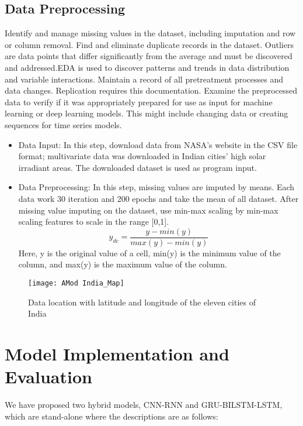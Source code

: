 \subsection{Data Preprocessing}
Identify and manage missing values in the dataset, including imputation and row or column removal. Find and eliminate duplicate records in the dataset. Outliers are data points that differ significantly from the average and must be discovered and addressed.EDA is used to discover patterns and trends in data distribution and variable interactions. Maintain a record of all pretreatment processes and data changes. Replication requires this documentation. Examine the preprocessed data to verify if it was appropriately prepared for use as input for machine learning or deep learning models. This might include changing data or creating sequences for time series models.
\begin{itemize}
\item
Data Input: In this step, download data from NASA's website in the CSV file format; multivariate data was downloaded in Indian cities' high solar irradiant areas. The downloaded dataset is used as program input.

\item
Data Preprocessing: In this step, missing values are imputed by means. Each data work 30 iteration and 200 epochs and take the mean of all dataset.
After missing value imputing on the dataset, use min-max scaling by min-max scaling features to scale in the range [0,1].
\begin{equation}
y_{dc}=\frac{y-min(y)}{max(y)-min(y)}
\end{equation}
Here, y is the original value of a cell, min(y) is the minimum value of the column, and max(y) is the maximum value of the column.
\end{itemize}


\begin{figure}[!ht]
\centering
\texttt{[image: AMod India\_Map]}
\caption{Data location with latitude and longitude of the eleven cities of India }
\label{Figure 1}
\end{figure}

\section{Model Implementation and Evaluation}

We have proposed two hybrid models, CNN-RNN and GRU-BILSTM-LSTM, which are stand-alone where the descriptions are as follows:

